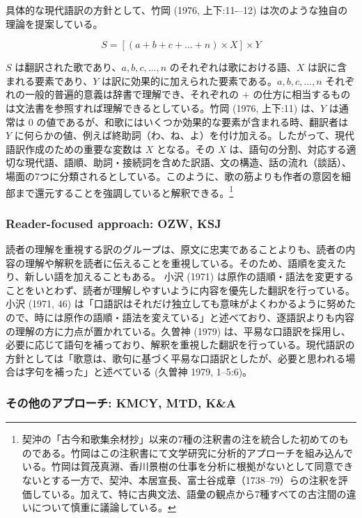\documentclass[
  letterpaper,
  DIV=11,
  numbers=noendperiod]{scrartcl}
\begin{document}
具体的な現代語訳の方針として、竹岡 (1976, 上下:11-\/--12)
は次のような独自の理論を提案している。

\[
S=\left[\left(a+b+c+\dots+n\right)\times X \right]\times Y
\]

\(S\) は翻訳された歌であり、\(a, b, c, \dots, n\)
のそれぞれは歌における語、\(X\) は訳に含まれる要素であり、\(Y\)
は訳に効果的に加えられた要素である。\(a, b, c, \dots, n\)
それぞれの一般的普遍的意義は辞書で理解でき、それぞれの \(+\)
の仕方に相当するものは文法書を参照すれば理解できるとしている。竹岡
(1976, 上下:11) は、\(Y\) は通常は 0
の値であるが、和歌にはいくつか効果的な要素が含まれる時、翻訳者は \(Y\)
に何らかの値、例えば終助詞（わ、ね、よ）を付け加える。したがって、現代語訳作成のための重要な変数は
\(X\) となる。その \(X\)
は、語句の分割、対応する適切な現代語、語順、助詞・接続詞を含めた訳語、文の構造、話の流れ（談話）、場面の7つに分類されるとしている。このように、歌の筋よりも作者の意図を細部まで還元することを強調していると解釈できる。\footnote{契沖の「古今和歌集余材抄」以来の7種の注釈書の注を統合した初めてのものである。竹岡はこの注釈書にて文学研究に分析的アプローチを組み込んでいる。竹岡は賀茂真淵、香川景樹の仕事を分析に根拠がないとして同意できないとする一方で、契沖、本居宣長、富士谷成章（1738--79）らの注釈を評価している。加えて、特に古典文法、語彙の観点から7種すべての古注間の違いについて慎重に議論している。}

\subsubsection*{Reader-focused approach: OZW,
KSJ}\label{reader-focused-approach-ozw-ksj}

読者の理解を重視する訳のグループは、原文に忠実であることよりも、読者の内容の理解や解釈を読者に伝えることを重視している。そのため、語順を変えたり、新しい語を加えることもある。
小沢 (1971)
は原作の語順・語法を変更することをいとわず、読者が理解しやすいように内容を優先した翻訳を行っている。
小沢 (1971, 46)
は「口語訳はそれだけ独立しても意味がよくわかるように努めたので、時には原作の語順・語法を変えている」と述べており、逐語訳よりも内容の理解の方に力点が置かれている。久曽神
(1979)
は、平易な口語訳を採用し、必要に応じて語句を補っており、解釈を重視した翻訳を行っている。現代語訳の方針としては「歌意は、歌句に基づく平易な口語訳としたが、必要と思われる場合は字句を補った」と述べている
(久曽神 1979, 1--5:6)。

\subsubsection*{その他のアプローチ: KMCY, MTD,
K\&A}\label{ux305dux306eux4ed6ux306eux30a2ux30d7ux30edux30fcux30c1-kmcy-mtd-ka}
\end{document}

